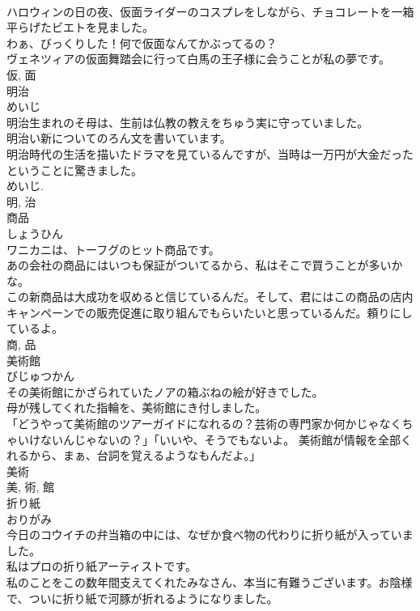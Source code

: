 \documentclass[8pt]{extreport}
\begin{document}
\begin{CJK}{UTF8}{min}
\\	ハロウィンの日の夜、仮面ライダーのコスプレをしながら、チョコレートを一箱平らげたビエトを見ました。	
\\	わぁ、びっくりした！何で仮面なんてかぶってるの？	
\\	ヴェネツィアの仮面舞踏会に行って白馬の王子様に会うことが私の夢です。	
\\	仮, 面	
\\	明治	
\\	めいじ	
\\	明治生まれのそ母は、生前は仏教の教えをちゅう実に守っていました。	
\\	明治い新についてのろん文を書いています。	
\\	明治時代の生活を描いたドラマを見ているんですが、当時は一万円が大金だったということに驚きました。	
\\	めいじ. 
\\	明, 治	
\\	商品	
\\	しょうひん	
\\	ワニカニは、トーフグのヒット商品です。	
\\	あの会社の商品にはいつも保証がついてるから、私はそこで買うことが多いかな。	
\\	この新商品は大成功を収めると信じているんだ。そして、君にはこの商品の店内キャンペーンでの販売促進に取り組んでもらいたいと思っているんだ。頼りにしているよ。	
\\	商, 品	
\\	美術館	
\\	びじゅつかん	
\\	その美術館にかざられていたノアの箱ぶねの絵が好きでした。	
\\	母が残してくれた指輪を、美術館にき付しました。	
\\	「どうやって美術館のツアーガイドになれるの？芸術の専門家か何かじゃなくちゃいけないんじゃないの？」「いいや、そうでもないよ。 美術館が情報を全部くれるから、まぁ、台詞を覚えるようなもんだよ。」	
\\	美術 
\\	美, 術, 館	
\\	折り紙	
\\	おりがみ	
\\	今日のコウイチの弁当箱の中には、なぜか食べ物の代わりに折り紙が入っていました。	
\\	私はプロの折り紙アーティストです。	
\\	私のことをこの数年間支えてくれたみなさん、本当に有難うございます。お陰様で、ついに折り紙で河豚が折れるようになりました。	

\end{CJK}
\end{document}
